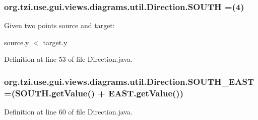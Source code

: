 \hypertarget{enumorg_1_1tzi_1_1use_1_1gui_1_1views_1_1diagrams_1_1util_1_1_direction_a6c985c142a7a83764ded55846b70099e}{
\subsubsection[{S\-O\-U\-T\-H}]{\setlength{\rightskip}{0pt plus 5cm}org.\-tzi.\-use.\-gui.\-views.\-diagrams.\-util.\-Direction.\-S\-O\-U\-T\-H =(4)}}\label{enumorg_1_1tzi_1_1use_1_1gui_1_1views_1_1diagrams_1_1util_1_1_direction_a6c985c142a7a83764ded55846b70099e}
Given two points {\ttfamily source} and {\ttfamily target}\-:\par
 {\ttfamily source.\-y $<$ target.\-y} 

Definition at line 53 of file Direction.\-java.

\hypertarget{enumorg_1_1tzi_1_1use_1_1gui_1_1views_1_1diagrams_1_1util_1_1_direction_aed70b0d431e0b24a6e4b11fe559d7245}{
\subsubsection[{S\-O\-U\-T\-H\-\_\-\-E\-A\-S\-T}]{\setlength{\rightskip}{0pt plus 5cm}org.\-tzi.\-use.\-gui.\-views.\-diagrams.\-util.\-Direction.\-S\-O\-U\-T\-H\-\_\-\-E\-A\-S\-T =(S\-O\-U\-T\-H.\-get\-Value() + E\-A\-S\-T.\-get\-Value())}}\label{enumorg_1_1tzi_1_1use_1_1gui_1_1views_1_1diagrams_1_1util_1_1_direction_aed70b0d431e0b24a6e4b11fe559d7245}


Definition at line 60 of file Direction.\-java.

